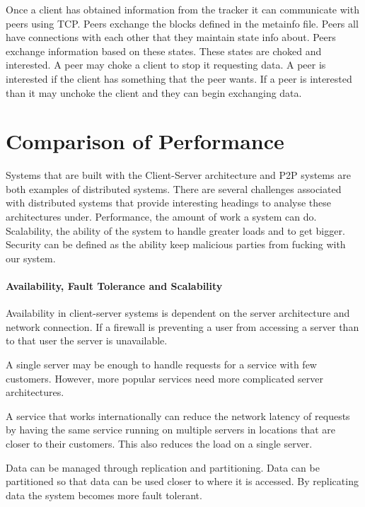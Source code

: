 \documentclass[11pt]{amsart}
\begin{document}
Once a client has obtained information from the tracker it can communicate with peers using TCP. Peers exchange the blocks defined in the metainfo file. Peers all have connections with each other that they maintain state info about. Peers exchange information based on these states.
\indent 
These states are choked and interested. A peer may choke a client to stop it requesting data. A peer is interested if the client has something that the peer wants. If a peer is interested than it may unchoke the client and they can begin exchanging data.

\part{Comparison of Performance}

Systems that are built with the Client-Server architecture and P2P systems are both examples of distributed systems. There are several challenges associated with distributed systems that provide interesting headings to analyse these architectures under. Performance, the amount of work a system can do. Scalability, the ability of the system to handle greater loads and to get bigger. Security can be defined as the ability keep malicious parties from fucking with our system. 

\subsection{Availability, Fault Tolerance and Scalability}

\indent 

Availability in client-server systems is dependent on the server architecture and network connection. If a firewall is preventing a user from accessing a server than to that user the server is unavailable.

\indent A single server may be enough to handle requests for a service with few customers. However, more popular services need more complicated server architectures.

\indent A service that works internationally can reduce the network latency of requests by having the same service running on multiple servers in locations that are closer to their customers. This also reduces the load on a single server.

\indent Data can be managed through replication and partitioning. Data can be partitioned so that data can be used closer to where it is accessed. By replicating data the system becomes more fault tolerant.
\end{document}
